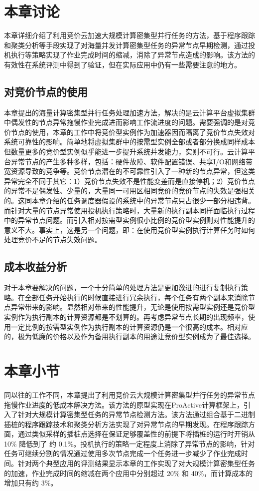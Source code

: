 \section{本章讨论}
本章详细介绍了利用竞价云加速大规模计算密集型并行任务的方法，基于程序跟踪和聚类分析等手段实现了对海量并发计算密集型任务的异常节点早期检测，通过投机执行等策略实现了作业完成时间的缩减，消除了异常节点造成的影响。该方法的有效性在系统评测中得到了验证，但在实际应用中仍有一些需要注意的地方。

\subsection{对竞价节点的使用}
本章提出的海量计算密集型并行任务处理加速方法，解决的是云计算平台虚拟集群中偶发性的节点异常拖慢作业完成进而影响工作流进度的问题。需要强调的是对竞价节点的使用，本章的工作中将竞价型实例作为加速器因而隔离了竞价节点失效对系统可靠性的影响。简单地将虚拟集群中的按需型实例全部或者部分换成同样成本但数量更多的竞价型实例似乎能进一步提升系统并发能力，实则不可行。云计算平台异常节点的产生多种多样，包括：硬件故障、软件配置错误、共享I/O和网络带宽资源导致的竞争等。竞价节点潜在的不可靠性引入了一种新的节点异常，但这类异常完全不同于其它：1）竞价节点失效不是性能变差而是直接停机；2）竞价节点的异常不是偶发性、少量的，大量同一可用区相同竞价的竞价节点的失效是强相关的。这同本章介绍的任务调度器假设的系统中的异常节点只占很少一部分相违背。而针对大量的节点异常使用投机执行策略时，大量新的执行副本同样面临执行过程中的异常节点问题。而引入相对按需型实例很小比例的竞价型实例则对性能提升的意义不大。事实上，这是另一个问题，即：在使用竞价型实例执行计算任务时如何处理竞价不足的节点失效问题。

\subsection{成本收益分析}
对于本章要解决的问题，一个十分简单的处理方法是更加激进的进行复制执行策略。在全部任务开始执行的时候直接进行冗余执行，每个任务有两个副本来消除节点异常带来的影响。显然相对带来的性能提升，无论是使用按需型实例还是竞价型实例作为执行副本的计算资源都是不划算的。再考虑异常节点长期的出现频率，使用一定比例的按需型实例作为执行副本的计算资源仍是一个很高的成本。相对应的，极为低廉的价格以及作为备用执行副本的用途让竞价型实例成为了最佳选择。

\section{本章小节}
同以往的工作不同，本章提出了利用竞价云大规模计算密集型并行任务的异常节点拖慢作业进度的低成本解决方法。该方法的原型实现在ProActive计算框架上，引入了针对大规模计算密集型任务的异常节点检测方法。该方法通过组合基于二进制插桩的程序跟踪技术和聚类分析方法实现了对异常节点的早期发现。在程序跟踪方面，通过类似采样的插桩点选择在保证足够覆盖性的前提下将插桩的运行时开销从 10\% 降低到了 约 0.1\%。投机执行的策略一定程度上消除了异常节点的影响，针对任务可继续分割的情况通过使用多次节点完成一个任务进一步减少了作业完成时间。针对两个典型应用的评测结果显示本章的工作实现了对大规模计算密集型任务的加速，作业完成时间的缩减在两个应用中分别超过 20\% 和 40\%，而计算成本的增加只有约 3\%。